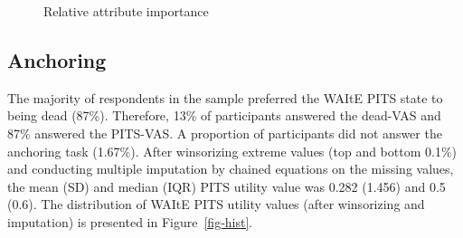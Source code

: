 \documentclass[
  number,
  preprint]{elsarticle}
\begin{document}
\begin{figure}


\caption{\label{fig-rai}Relative attribute importance}

\end{figure}%

\subsection{Anchoring}\label{anchoring}

The majority of respondents in the sample preferred the WAItE PITS state
to being dead (87\%). Therefore, 13\% of participants answered the
dead-VAS and 87\% answered the PITS-VAS. A proportion of participants
did not answer the anchoring task (1.67\%). After winsorizing extreme
values (top and bottom 0.1\%) \citep{2003ApplyingTechniques} and
conducting multiple imputation by chained equations on the missing
values, the mean (SD) and median (IQR) PITS utility value was 0.282
(1.456) and 0.5 (0.6). The distribution of WAItE PITS utility values
(after winsorizing and imputation) is presented in
Figure~\ref{fig-hist}.
\end{document}
